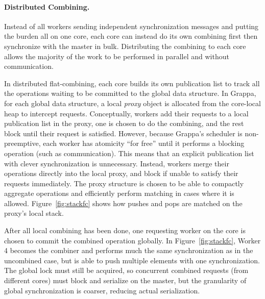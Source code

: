 \paragraph{Distributed Combining.}
Instead of all workers sending independent synchronization messages and putting the burden all on one core, each core can instead do its own combining first then synchronize with the master in bulk.
Distributing the combining to each core allows the majority of the work to be performed in parallel and without communication.


In distributed flat-combining, each core builds its own publication list to track all the operations waiting to be committed to the global data structure.
In Grappa, for each global data structure, a local \emph{proxy} object is allocated from the core-local heap to intercept requests.
Conceptually, workers add their requests to a local publication list in the proxy, one is chosen to do the combining, and the rest block until their request is satisfied.
However, because Grappa's scheduler is non-preemptive, each worker has atomicity ``for free'' until it performs a blocking operation (such as communication).
This means that an explicit publication list with clever synchronization is unnecessary.
Instead, workers merge their operations directly into the local proxy, and block if unable to satisfy their requests immediately.
The proxy structure is chosen to be able to compactly aggregate operations and efficiently perform matching in cases where it is allowed. Figure~\ref{fig:stackfc} shows how pushes and pops are matched on the proxy's local stack.

After all local combining has been done, one requesting worker on the core is chosen to commit the combined operation globally. In Figure~\ref{fig:stackfc}, Worker 4 becomes the combiner and performs much the same synchronization as in the uncombined case, but is able to push multiple elements with one synchronization. The global lock must still be acquired, so concurrent combined requests (from different cores) must block and serialize on the master, but the granularity of global synchronization is coarser, reducing actual serialization.

